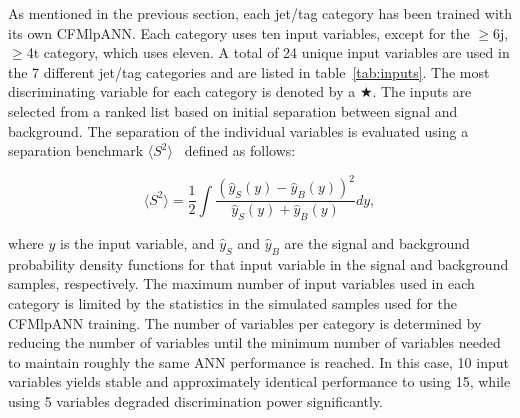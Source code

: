 \par As mentioned in the previous section, each jet/tag category has
been trained with its own CFMlpANN.  Each category uses ten input
variables, except for the $\ge$6j, $\ge$4t category, which uses
eleven.  A total of 24 unique input variables are used in the 7
different jet/tag categories and are listed in
table~\ref{tab:inputs}.  The most discriminating variable for each
category is denoted by a $\bigstar$.  The inputs are selected from a
ranked list based on initial separation between signal and background.
The separation of the individual variables is evaluated using a
separation benchmark $\langle S^2 \rangle$~\cite{Hocker:2007ht}
defined as follows: 

\begin{equation}\label{eq:separation}
\langle S^2 \rangle = \frac{1}{2}
 \int{\frac{\left(\hat{y}_S(y) - \hat{y}_B(y)\right)^2}{\hat{y}_S(y) +
 \hat{y}_B(y)} dy}, 
\end{equation} 

\noindent where $y$ is the input variable, and $\hat{y}_S$ and
$\hat{y}_B$ are the signal and background probability density
functions for that input variable in the signal and background
samples, respectively. The maximum number of input variables
used in each category is limited by the statistics in the simulated
samples used for the CFMlpANN training. The number of variables per category is
determined by reducing the number of variables until the minimum
number of variables needed to maintain roughly the same ANN
performance is reached. In this case, 10 input variables yields stable
and approximately identical performance to using 15, while using 5
variables degraded discrimination power significantly.

